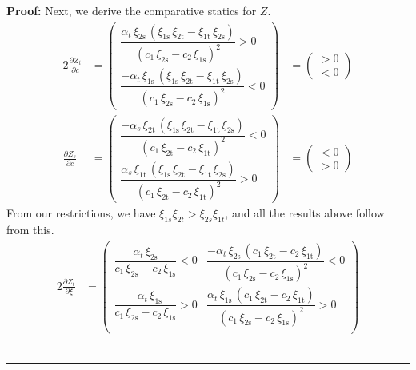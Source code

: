 \documentclass[11pt,a4paper]{extarticle}
\newenvironment{proof}[1][Proof]{\noindent\textbf{#1:} }{\ \rule{0.5em}{0.5em}}
\begin{document}
\begin{proof}
	Next, we derive the comparative statics for $Z$. 
	\begin{alignat*}{2}
	\frac{\partial Z_t}{\partial c} &= 
	\begin{pmatrix}
	\dfrac{\alpha _{t}\,\xi _{\mathrm{2s}}\,\left(\xi _{\mathrm{1s}}\,\xi _{\mathrm{2t}}-\xi _{\mathrm{1t}}\,\xi _{\mathrm{2s}}\right)}{{\left(c_{1}\,\xi _{\mathrm{2s}}-c_{2}\,\xi _{\mathrm{1s}}\right)}^2}>0\\
	\dfrac{-\alpha _{t}\,\xi _{\mathrm{1s}}\,\left(\xi _{\mathrm{1s}}\,\xi _{\mathrm{2t}}-\xi _{\mathrm{1t}}\,\xi _{\mathrm{2s}}\right)}{{\left(c_{1}\,\xi _{\mathrm{2s}}-c_{2}\,\xi _{\mathrm{1s}}\right)}^2}<0
	\end{pmatrix}
	&=
	\begin{pmatrix}
	> 0 \\
	< 0 
	\end{pmatrix} \\
	\frac{\partial Z_s}{\partial c} &= 
	\begin{pmatrix}
	\dfrac{-\alpha _{s}\,\xi _{\mathrm{2t}}\,\left(\xi _{\mathrm{1s}}\,\xi _{\mathrm{2t}}-\xi _{\mathrm{1t}}\,\xi _{\mathrm{2s}}\right)}{{\left(c_{1}\,\xi _{\mathrm{2t}}-c_{2}\,\xi _{\mathrm{1t}}\right)}^2} <0\\
	\dfrac{\alpha _{s}\,\xi _{\mathrm{1t}}\,\left(\xi _{\mathrm{1s}}\,\xi _{\mathrm{2t}}-\xi _{\mathrm{1t}}\,\xi _{\mathrm{2s}}\right)}{{\left(c_{1}\,\xi _{\mathrm{2t}}-c_{2}\,\xi _{\mathrm{1t}}\right)}^2} >0
	\end{pmatrix}
	&=
	\begin{pmatrix}
	< 0 \\
	> 0 
	\end{pmatrix}
	\end{alignat*}
	From our restrictions, we have $\xi_{1s}\xi_{2t} > \xi_{2s}\xi_{1t}$, and all the results above follow from this. 
	\begin{alignat*}{2}
	\frac{\partial Z_t}{\partial \xi} &= 
	\begin{pmatrix}
	\dfrac{\alpha _{t}\,\xi _{\mathrm{2s}}}{c_{1}\,\xi _{\mathrm{2s}}-c_{2}\,\xi _{\mathrm{1s}}} < 0& \dfrac{-\alpha _{t}\,\xi _{\mathrm{2s}}\,\left(c_{1}\,\xi _{\mathrm{2t}}-c_{2}\,\xi _{\mathrm{1t}}\right)}{{\left(c_{1}\,\xi _{\mathrm{2s}}-c_{2}\,\xi _{\mathrm{1s}}\right)}^2} <0 \\
	\dfrac{-\alpha _{t}\,\xi _{\mathrm{1s}}}{c_{1}\,\xi _{\mathrm{2s}}-c_{2}\,\xi _{\mathrm{1s}}} >0& \dfrac{\alpha _{t}\,\xi _{\mathrm{1s}}\,\left(c_{1}\,\xi _{\mathrm{2t}}-c_{2}\,\xi _{\mathrm{1t}}\right)}{{\left(c_{1}\,\xi _{\mathrm{2s}}-c_{2}\,\xi _{\mathrm{1s}}\right)}^2} >0\\

\end{pmatrix}
\end{alignat*}
\end{proof}
\end{document}
